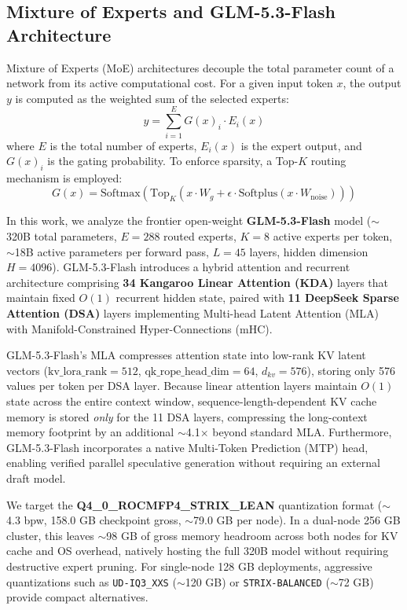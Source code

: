 \documentclass[11pt,a4paper]{article}
\begin{document}
\subsection{Mixture of Experts and GLM-5.3-Flash Architecture}
Mixture of Experts (MoE) architectures decouple the total parameter count of a network from its active computational cost. For a given input token $x$, the output $y$ is computed as the weighted sum of the selected experts:
\begin{equation}
    y = \sum_{i=1}^{E} G(x)_i \cdot E_i(x)
\end{equation}
where $E$ is the total number of experts, $E_i(x)$ is the expert output, and $G(x)_i$ is the gating probability. To enforce sparsity, a Top-$K$ routing mechanism is employed:
\begin{equation}
    G(x) = \text{Softmax}\left(\text{Top}_K(x \cdot W_g + \epsilon \cdot \text{Softplus}(x \cdot W_{\text{noise}}))\right)
\end{equation}

In this work, we analyze the frontier open-weight \textbf{GLM-5.3-Flash} model \cite{glm5} ($\sim$320B total parameters, $E=288$ routed experts, $K=8$ active experts per token, $\sim$18B active parameters per forward pass, $L=45$ layers, hidden dimension $H=4096$). GLM-5.3-Flash introduces a hybrid attention and recurrent architecture comprising \textbf{34 Kangaroo Linear Attention (KDA)} layers that maintain fixed $O(1)$ recurrent hidden state, paired with \textbf{11 DeepSeek Sparse Attention (DSA)} layers implementing Multi-head Latent Attention (MLA) with Manifold-Constrained Hyper-Connections (mHC). 

GLM-5.3-Flash's MLA compresses attention state into low-rank KV latent vectors ($\text{kv\_lora\_rank}=512$, $\text{qk\_rope\_head\_dim}=64$, $d_{kv}=576$), storing only 576 values per token per DSA layer. Because linear attention layers maintain $O(1)$ state across the entire context window, sequence-length-dependent KV cache memory is stored \textit{only} for the 11 DSA layers, compressing the long-context memory footprint by an additional $\sim$4.1$\times$ beyond standard MLA. Furthermore, GLM-5.3-Flash incorporates a native Multi-Token Prediction (MTP) head, enabling verified parallel speculative generation without requiring an external draft model.

We target the \textbf{Q4\_0\_ROCMFP4\_STRIX\_LEAN} quantization format ($\sim$4.3 bpw, 158.0 GB checkpoint gross, $\sim$79.0 GB per node). In a dual-node 256 GB cluster, this leaves $\sim$98 GB of gross memory headroom across both nodes for KV cache and OS overhead, natively hosting the full 320B model without requiring destructive expert pruning. For single-node 128 GB deployments, aggressive quantizations such as \texttt{UD-IQ3\_XXS} ($\sim$120 GB) or \texttt{STRIX-BALANCED} ($\sim$72 GB) provide compact alternatives.
\end{document}
